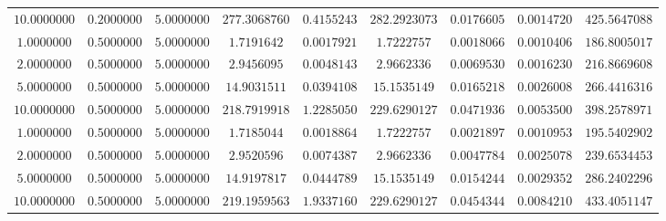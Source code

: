 \begin{tabular}{ccccccccc}
$10.0000000$ & $0.2000000$ & $5.0000000$ & $277.3068760$ & $0.4155243$ & $282.2923073$ & $0.0176605$ & $0.0014720$ & $425.5647088$\\
$1.0000000$ & $0.5000000$ & $5.0000000$ & $1.7191642$ & $0.0017921$ & $1.7222757$ & $0.0018066$ & $0.0010406$ & $186.8005017$\\
$2.0000000$ & $0.5000000$ & $5.0000000$ & $2.9456095$ & $0.0048143$ & $2.9662336$ & $0.0069530$ & $0.0016230$ & $216.8669608$\\
$5.0000000$ & $0.5000000$ & $5.0000000$ & $14.9031511$ & $0.0394108$ & $15.1535149$ & $0.0165218$ & $0.0026008$ & $266.4416316$\\
$10.0000000$ & $0.5000000$ & $5.0000000$ & $218.7919918$ & $1.2285050$ & $229.6290127$ & $0.0471936$ & $0.0053500$ & $398.2578971$\\
$1.0000000$ & $0.5000000$ & $5.0000000$ & $1.7185044$ & $0.0018864$ & $1.7222757$ & $0.0021897$ & $0.0010953$ & $195.5402902$\\
$2.0000000$ & $0.5000000$ & $5.0000000$ & $2.9520596$ & $0.0074387$ & $2.9662336$ & $0.0047784$ & $0.0025078$ & $239.6534453$\\
$5.0000000$ & $0.5000000$ & $5.0000000$ & $14.9197817$ & $0.0444789$ & $15.1535149$ & $0.0154244$ & $0.0029352$ & $286.2402296$\\
$10.0000000$ & $0.5000000$ & $5.0000000$ & $219.1959563$ & $1.9337160$ & $229.6290127$ & $0.0454344$ & $0.0084210$ & $433.4051147$\\
\end{tabular}
